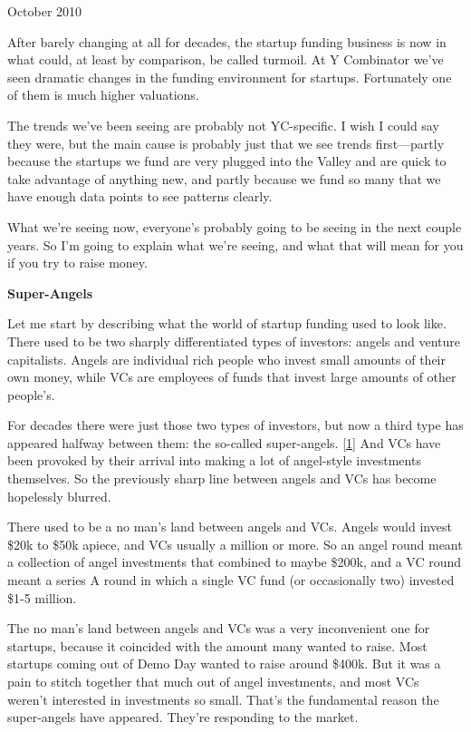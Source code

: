October 2010

After barely changing at all for decades, the startup funding business
is now in what could, at least by comparison, be called turmoil. At Y
Combinator we've seen dramatic changes in the funding environment for
startups. Fortunately one of them is much higher valuations.

The trends we've been seeing are probably not YC-specific. I wish I
could say they were, but the main cause is probably just that we see
trends first---partly because the startups we fund are very plugged into
the Valley and are quick to take advantage of anything new, and partly
because we fund so many that we have enough data points to see patterns
clearly.

What we're seeing now, everyone's probably going to be seeing in the
next couple years. So I'm going to explain what we're seeing, and what
that will mean for you if you try to raise money.

\textbf{Super-Angels}

Let me start by describing what the world of startup funding used to
look like. There used to be two sharply differentiated types of
investors: angels and venture capitalists. Angels are individual rich
people who invest small amounts of their own money, while VCs are
employees of funds that invest large amounts of other people's.

For decades there were just those two types of investors, but now a
third type has appeared halfway between them: the so-called
super-angels. {[}\hyperref[f1n]{1}{]} And VCs have been provoked by
their arrival into making a lot of angel-style investments themselves.
So the previously sharp line between angels and VCs has become
hopelessly blurred.

There used to be a no man's land between angels and VCs. Angels would
invest \$20k to \$50k apiece, and VCs usually a million or more. So an
angel round meant a collection of angel investments that combined to
maybe \$200k, and a VC round meant a series A round in which a single VC
fund (or occasionally two) invested \$1-5 million.

The no man's land between angels and VCs was a very inconvenient one for
startups, because it coincided with the amount many wanted to raise.
Most startups coming out of Demo Day wanted to raise around \$400k. But
it was a pain to stitch together that much out of angel investments, and
most VCs weren't interested in investments so small. That's the
fundamental reason the super-angels have appeared. They're responding to
the market.

